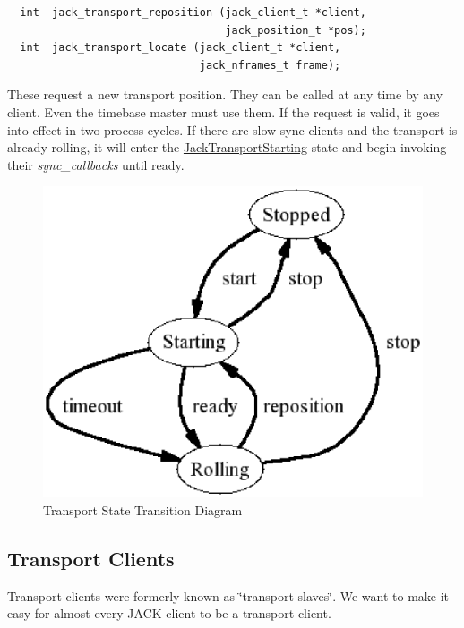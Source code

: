 \footnotesize\begin{verbatim}  int  jack_transport_reposition (jack_client_t *client,
                                  jack_position_t *pos);
  int  jack_transport_locate (jack_client_t *client,
                              jack_nframes_t frame);
\end{verbatim}
\normalsize


These request a new transport position. They can be called at any time by any client. Even the timebase master must use them. If the request is valid, it goes into effect in two process cycles. If there are slow-sync clients and the transport is already rolling, it will enter the \hyperlink{transport_8h_499ffea77b03cce9c647d7b5065f733826f99f6e435fe2f37ffce708fe128d12}{Jack\-Transport\-Starting} state and begin invoking their {\em sync\_\-callbacks\/} until ready.

\begin{figure}[H]
\begin{center}
\includegraphics{fsm}\caption{Transport State Transition Diagram}
\end{center}
\end{figure}
\hypertarget{transport-design_transportclients}{}\subsection{Transport Clients}\label{transport-design_transportclients}
Transport clients were formerly known as \char`\"{}transport slaves\char`\"{}. We want to make it easy for almost every JACK client to be a transport client.



